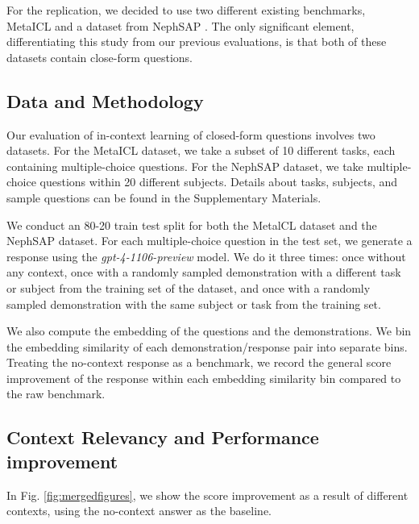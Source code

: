 \documentclass{article}
\begin{document}
    For the replication, we decided to use two different existing benchmarks, MetaICL \citep{min2022metaicl} and a dataset from NephSAP \citep{unknown}. The only significant element, differentiating this study from our previous evaluations, is that both of these datasets contain close-form questions.

\subsection{Data and Methodology}

    Our evaluation of in-context learning of closed-form questions involves two datasets. For the MetaICL dataset, we take a subset of 10 different tasks, each containing multiple-choice questions. For the NephSAP dataset, we take multiple-choice questions within 20 different subjects. Details about tasks, subjects, and sample questions can be found in the Supplementary Materials.

    We conduct an 80-20 train test split for both the MetalCL dataset and the NephSAP dataset. For each multiple-choice question in the test set, we generate a response using the \emph{gpt-4-1106-preview} model. We do it three times: once without any context, once with a randomly sampled demonstration with a different task or subject from the training set of the dataset, and once with a randomly sampled demonstration with the same subject or task from the training set.

    We also compute the embedding of the questions and the demonstrations. We bin the embedding similarity of each demonstration/response pair into separate bins. Treating the no-context response as a benchmark, we record the general score improvement of the response within each embedding similarity bin compared to the raw benchmark.

\subsection{Context Relevancy and Performance improvement}

    In Fig. \ref{fig:mergedfigures}, we show the score improvement as a result of different contexts, using the no-context answer as the baseline.
\end{document}

